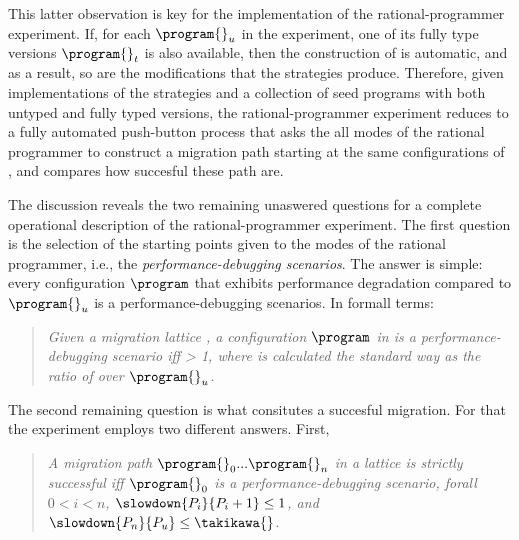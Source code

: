 This latter observation is key for the implementation of the
rational-programmer experiment. If, for each  $\program{}_u$ in the
experiment, one of its fully type versions $\program{}_t$ is also
available, then the construction of  is
automatic, and as a result, so are the modifications that the strategies 
produce. Therefore, given implementations of the strategies and a
collection of seed programs with both untyped and fully typed versions,
the rational-programmer experiment reduces to a fully automated push-button 
process that asks the all modes of the rational programmer to
construct a migration path starting at the same configurations of   
, and compares how succesful these path are. 

The discussion reveals the two remaining unaswered questions for a complete
operational description of the rational-programmer experiment. The first
question is the
selection of the starting points given to the modes of the rational
programmer, i.e., the \emph{performance-debugging scenarios}. 
The answer is simple: 
every configuration $\program$ that exhibits performance degradation compared to 
$\program{}_u$ is a performance-debugging scenarios. In formall terms: 

\begin{quote}
\it Given a migration lattice , a configuration $\program$
  in  is a \emph{performance-debugging scenario}
  iff  > 1, where \slowdownkw{} is
  calculated the standard way as the ratio of \program{} over $\program{}_u$.  
\end{quote}

The second remaining question is what consitutes a succesful migration.
For that the experiment employs two different answers. First, 
\begin{quote}
\it A migration path ${\program{}_0}
  ... {\program{}_n}$ in a lattice 
  is \emph{strictly successful} iff $\program{}_0$ 
  is a performance-debugging scenario, forall $0 < i < n$, 
  $\slowdown{P_i}{P_i+1} \leq 1$, and $\slowdown{P_n}{P_u} \leq \takikawa{}$.
\end{quote}






